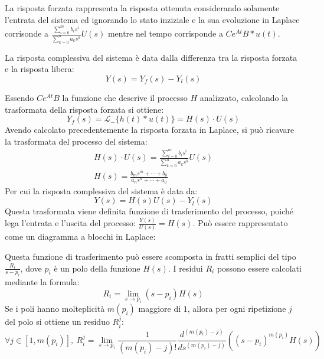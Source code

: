\documentclass{article}
\numberwithin{equation}{subsection}
\begin{document}
La risposta forzata rappresenta la risposta ottenuta considerando solamente l'entrata del sistema ed ignorando lo stato inziziale e la sua evoluzione in Laplace corrisonde a 
$\displaystyle\frac{\sum_{i=0}^{m}b_is^i}{\sum_{k=0}^{n}a_ks^k}U(s)$ mentre nel tempo corrisponde a $Ce^{At}B*u(t)$.


La risposta complessiva del sistema è data dalla differenza tra la risposta forzata e la risposta libera: 
\begin{equation}
    Y(s)=Y_f(s)-Y_l(s)
\end{equation}

Essendo $Ce^{At}B$ la funzione che descrive il processo $H$ analizzato, calcolando la trasformata della risposta forzata si ottiene:
\begin{equation}
    Y_f(s)=\mathscr{L}_-\{h(t)*u(t)\}=H(s)\cdot U(s)
\end{equation}
Avendo calcolato precedentemente la risposta forzata in Laplace, si può ricavare la trasformata del processo del sistema:
\begin{gather}
    H(s)\cdot U(s)=\displaystyle\frac{\sum_{i=0}^{m}b_is^i}{\sum_{k=0}^{n}a_ks^k}U(s)\\
    H(s)=\displaystyle\frac{b_ms^m+\cdots+b_0}{a_ns^n+\cdots+a_0}
\end{gather}
Per cui la risposta complessiva del sistema è data da:
\begin{equation}
    Y(s)=H(s)U(s)-Y_l(s)
\end{equation}
Questa trasformata viene definita funzione di trasferimento del processo, poiché lega l'entrata e l'uscita del processo: $\displaystyle\frac{Y(s)}{U(s)}=H(s)$. Può essere 
rappresentato come un diagramma a blocchi in Laplace:
\begin{center}
\end{center}

Questa funzione di trasferimento può essere scomposta in fratti semplici del tipo $\displaystyle\frac{R_i}{s-p_i}$, dove $p_i$ è un polo della funzione $H(s)$. I residui $R_i$ 
possono essere calcolati mediante la formula: 
\begin{equation}
    R_i=\lim_{s\to p_i}(s-p_i)H(s)
\end{equation}
Se i poli hanno molteplicità $m(p_i)$ maggiore di $1$, allora per ogni ripetizione $j$ del polo si ottiene un residuo $R_i^j$:
\begin{equation}
    \forall j\in[1,m(p_i)],\:R_i^j=\lim_{s\to p_i}\displaystyle\frac{1}{(m(p_i)-j)!}\frac{d^{(m(p_i)-j)}}{ds^{(m(p_i)-j)}}\left((s-p_i)^{m(p_i)}H(s)\right)
\end{equation}
\end{document}
